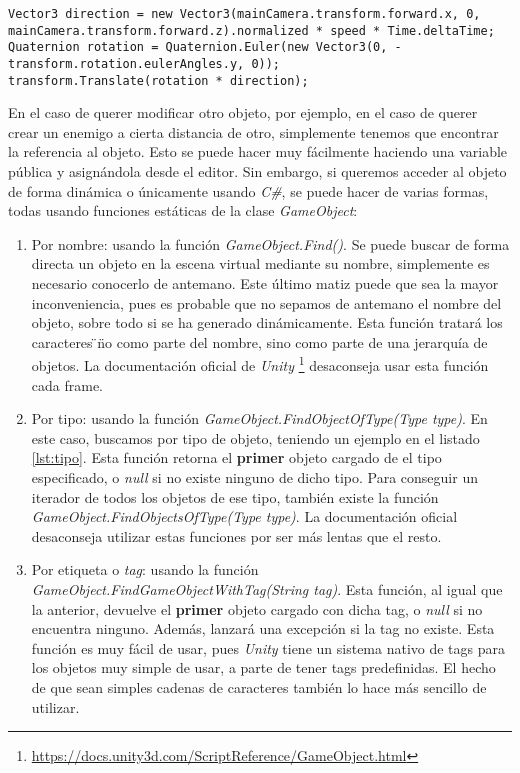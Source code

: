 \documentclass{pre-tfg}
\begin{document}
\begin{lstlisting}[caption={Acceso al componente transform para modificar el propio objeto}, label=lst:local]
Vector3 direction = new Vector3(mainCamera.transform.forward.x, 0, mainCamera.transform.forward.z).normalized * speed * Time.deltaTime;
Quaternion rotation = Quaternion.Euler(new Vector3(0, -transform.rotation.eulerAngles.y, 0));
transform.Translate(rotation * direction);
\end{lstlisting}

En el caso de querer modificar otro objeto, por ejemplo, en el caso de querer crear un enemigo a cierta distancia de otro, simplemente tenemos que encontrar la referencia al objeto. Esto se puede hacer muy fácilmente haciendo una variable pública y asignándola desde el editor. Sin embargo, si queremos acceder al objeto de forma dinámica o únicamente usando \textit{C\#}, se puede hacer de varias formas, todas usando funciones estáticas de la clase \textit{GameObject}:

\begin{enumerate}
\item Por nombre: usando la función \textit{GameObject.Find()}. Se puede buscar de forma directa un objeto en la escena virtual mediante su nombre, simplemente es necesario conocerlo de antemano. Este último matiz puede que sea la mayor inconveniencia, pues es probable que no sepamos de antemano el nombre del objeto, sobre todo si se ha generado dinámicamente. Esta función tratará los caracteres \"\/\" no como parte del nombre, sino como parte de una jerarquía de objetos. La documentación oficial de \textit{Unity} \footnote{\url{https://docs.unity3d.com/ScriptReference/GameObject.html}} desaconseja usar esta función cada frame.
\item Por tipo: usando la función \textit{GameObject.FindObjectOfType(Type type)}. En este caso, buscamos por tipo de objeto, teniendo un ejemplo en el listado \ref{lst:tipo}.
 Esta función retorna el \textbf{primer} objeto cargado de el tipo especificado, o \textit{null} si no existe ninguno de dicho tipo. Para conseguir un iterador de todos los objetos de ese tipo, también existe la función \textit{GameObject.FindObjectsOfType(Type type)}. La documentación oficial desaconseja utilizar estas funciones por ser más lentas que el resto.
\item Por etiqueta o \textit{tag}: usando la función \textit{GameObject.FindGameObjectWithTag(String tag)}. Esta función, al igual que la anterior, devuelve el \textbf{primer} objeto cargado con dicha tag, o \textit{null} si no encuentra ninguno. Además, lanzará una excepción si la tag no existe. Esta función es muy fácil de usar, pues \textit{Unity} tiene un sistema nativo de tags para los objetos muy simple de usar, a parte de tener tags predefinidas. El hecho de que sean simples cadenas de caracteres también lo hace más sencillo de utilizar. 
\end{enumerate}
\end{document}
